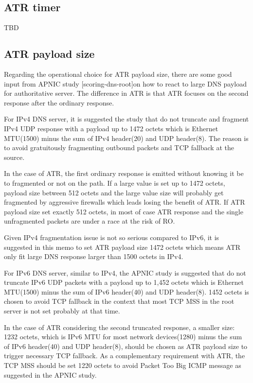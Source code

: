    \subsection{ATR timer}

   TBD

   \subsection{ATR payload size}
      Regarding the operational choice for ATR payload size, there are some
   good input from APNIC study [scoring-dns-root]on how to react to
   large DNS payload for authoritative server.  The difference in ATR is
   that ATR focuses on the second response after the ordinary response.

   For IPv4 DNS server, it is suggested the study that do not truncate
   and fragment IPv4 UDP response with a payload up to 1472 octets which
   is Ethernet MTU(1500) minus the sum of IPv4 header(20) and UDP
   header(8).  The reason is to avoid gratuitously fragmenting outbound
   packets and TCP fallback at the source.

   In the case of ATR, the first ordinary response is emitted without
   knowing it be to fragmented or not on the path.  If a large value is
   set up to 1472 octets, payload size between 512 octets and the large
   value size will probably get fragmented by aggressive firewalls which
   leads losing the benefit of ATR.  If ATR payload size set exactly 512
   octets, in most of case ATR response and the single unfragmented
   packets are under a race at the risk of RO.

   Given IPv4 fragmentation issue is not so serious compared to IPv6, it
   is suggested in this memo to set ATR payload size 1472 octets which
   means ATR only fit large DNS response larger than 1500 octets in
   IPv4.

   For IPv6 DNS server, similar to IPv4, the APNIC study is suggested
   that do not truncate IPv6 UDP packets with a payload up to 1,452
   octets which is Ethernet MTU(1500) minus the sum of IPv6 header(40)
   and UDP header(8). 1452 octets is chosen to avoid TCP fallback in the
   context that most TCP MSS in the root server is not set probably at
   that time.

   In the case of ATR considering the second truncated response, a
   smaller size: 1232 octets, which is IPv6 MTU for most network
   devices(1280) minus the sum of IPv6 header(40) and UDP header(8),
   should be chosen as ATR payload size to trigger necessary TCP
   fallback.  As a complementary requirement with ATR, the TCP MSS
   should be set 1220 octets to avoid Packet Too Big ICMP message as
   suggested in the APNIC study.

